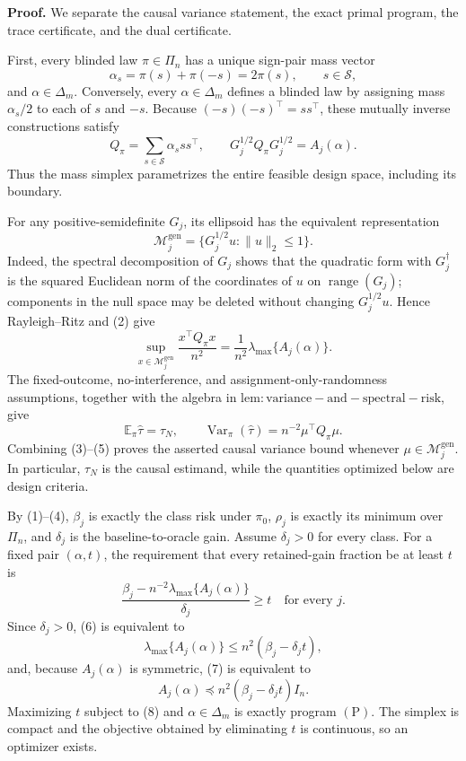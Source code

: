 \textbf{Proof.}
We separate the causal variance statement, the exact primal program, the trace certificate, and the dual certificate.

First, every blinded law \(\pi\in\Pi_n\) has a unique sign-pair mass vector
\[
\alpha_s=\pi(s)+\pi(-s)=2\pi(s),
\qquad s\in\mathscr S,
\tag{1}
\]
and \(\alpha\in\Delta_m\).  Conversely, every \(\alpha\in\Delta_m\) defines a blinded law by assigning mass \(\alpha_s/2\) to each of \(s\) and \(-s\).  Because \((-s)(-s)^\top=ss^\top\), these mutually inverse constructions satisfy
\[
Q_\pi=\sum_{s\in\mathscr S}\alpha_s ss^\top,
\qquad
G_j^{1/2}Q_\pi G_j^{1/2}=A_j(\alpha).
\tag{2}
\]
Thus the mass simplex parametrizes the entire feasible design space, including its boundary.

For any positive-semidefinite \(G_j\), its ellipsoid has the equivalent representation
\[
\mathcal M_j^{\mathrm{gen}}
=\{G_j^{1/2}u:\|u\|_2\le1\}.
\tag{3}
\]
Indeed, the spectral decomposition of \(G_j\) shows that the quadratic form with \(G_j^\dagger\) is the squared Euclidean norm of the coordinates of \(u\) on \(\operatorname{range}(G_j)\); components in the null space may be deleted without changing \(G_j^{1/2}u\).  Hence Rayleigh--Ritz and (2) give
\[
\sup_{x\in\mathcal M_j^{\mathrm{gen}}}
\frac{x^\top Q_\pi x}{n^2}
=\frac1{n^2}\lambda_{\max}\{A_j(\alpha)\}.
\tag{4}
\]
The fixed-outcome, no-interference, and assignment-only-randomness assumptions, together with the algebra in \(\mathrm{lem:variance-and-spectral-risk}\), give
\[
\mathbb E_\pi\widehat\tau=\tau_N,
\qquad
\operatorname{Var}_\pi(\widehat\tau)
=n^{-2}\mu^\top Q_\pi\mu.
\tag{5}
\]
Combining (3)--(5) proves the asserted causal variance bound whenever \(\mu\in\mathcal M_j^{\mathrm{gen}}\).  In particular, \(\tau_N\) is the causal estimand, while the quantities optimized below are design criteria.

By (1)--(4), \(\beta_j\) is exactly the class risk under \(\pi_0\), \(\rho_j\) is exactly its minimum over \(\Pi_n\), and \(\delta_j\) is the baseline-to-oracle gain.  Assume \(\delta_j>0\) for every class.  For a fixed pair \((\alpha,t)\), the requirement that every retained-gain fraction be at least \(t\) is
\[
\frac{\beta_j-n^{-2}\lambda_{\max}\{A_j(\alpha)\}}{\delta_j}
\ge t
\quad\text{for every }j.
\tag{6}
\]
Since \(\delta_j>0\), (6) is equivalent to
\[
\lambda_{\max}\{A_j(\alpha)\}
\le n^2(\beta_j-\delta_jt),
\tag{7}
\]
and, because \(A_j(\alpha)\) is symmetric, (7) is equivalent to
\[
A_j(\alpha)\preceq n^2(\beta_j-\delta_jt)I_n.
\tag{8}
\]
Maximizing \(t\) subject to (8) and \(\alpha\in\Delta_m\) is exactly program \((\mathrm P)\).  The simplex is compact and the objective obtained by eliminating \(t\) is continuous, so an optimizer exists.

